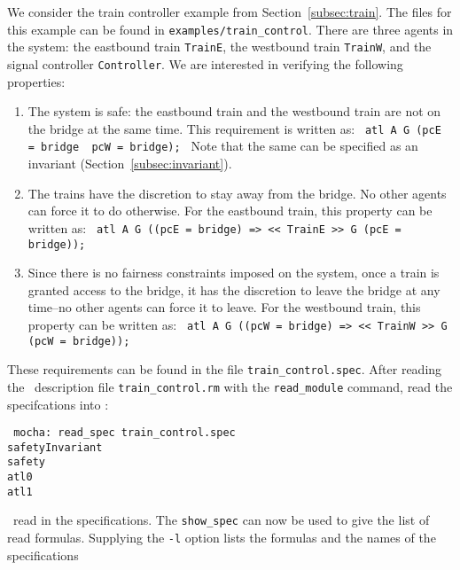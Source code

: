 We consider the train controller example from
Section~\ref{subsec:train}. The files for this example
can be found in {\tt examples/train\_control}. There are
three agents in the system: the eastbound train {\tt TrainE},
the westbound train {\tt TrainW}, and the signal controller 
{\tt Controller}. We are interested in verifying the
following properties:
\begin{enumerate}
\item
The system is safe: the eastbound train
and the westbound train are not on the bridge at the same time.  This
requirement is written as: 
{\tt
atl A G \NOT (pcE = bridge \AND\ pcW = bridge);
}
Note that the same can be specified as an invariant
(Section~\ref{subsec:invariant}).

\item
The trains have the discretion to stay away from
 the bridge. No other agents can force it to do otherwise. 
For the eastbound train, this property can be written as:
{\tt
atl A G (\NOT(pcE = bridge) => << TrainE >> G \NOT(pcE = bridge));
}

\item
Since there is no fairness constraints imposed on the system, once a
train is granted access to the bridge, it has the discretion to leave
the bridge at any time--no other agents can force it to leave. For the
westbound train, this property can be written as:
{\tt
atl A G ((pcW = bridge) => << TrainW >> G (pcW = bridge));
}
\end{enumerate}

\mypar
These requirements can be found in the file {\tt train\_control.spec}. After
reading the \rem\ description file {\tt train\_control.rm} with the
{\tt read\_module} command, read the specifcations into  \mocha:

\mypar
{\tt 
mocha: read\_spec train\_control.spec\\
safetyInvariant\\
safety\\
atl0\\
atl1\\
}

\mypar
\mocha\ read in the specifications. The {\tt show\_spec} can now be used to give the list
of read formulas. Supplying the {\tt -l} option lists the formulas and the
names of the specifications

